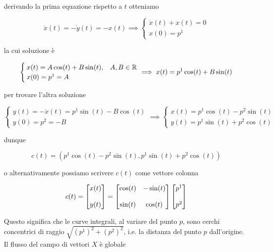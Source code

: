 derivando la prima equazione rispetto a $ t $ otteniamo

\begin{equation}
	\ddot{x}(t) = - \dot{y}(t) = - x(t) %
	\implies %
	\begin{cases}
		\ddot{x}(t) + x(t) = 0 \\
		x(0) = p^{1}
	\end{cases}
\end{equation}

la cui soluzione è

\begin{equation}
	\begin{cases}
		x(t) = A \cos(t) + B \sin(t), & A,B \in \R \\
		x(0) = p^{1} = A
	\end{cases} %
	\implies %
	x(t) = p^{1} \cos(t) + B \sin(t)
\end{equation}

per trovare l'altra soluzione

\begin{equation}
	\begin{cases}
		y(t) = - \dot{x}(t) = p^{1} \sin(t) - B \cos(t) \\
		y(0) = p^{2} = - B
	\end{cases} %
	\implies %
	\begin{cases}
		x(t) = p^{1} \cos(t) - p^{2} \sin(t) \\
		y(t) = p^{1} \sin(t) + p^{2} \cos(t)
	\end{cases}
\end{equation}

dunque

\begin{equation}
	c(t) = (p^{1} \cos(t) - p^{2} \sin(t), p^{1} \sin(t) + p^{2} \cos(t))
\end{equation}

o alternativamente possiamo scrivere $ c(t) $ come vettore colonna

\begin{equation}
	c(t) = \bmqty{ x(t) \\ \\ y(t) } %
	= \bmqty{
		\cos(t) & - \sin(t) \\ \\
		\sin(t) & \cos(t) %
		} %
		\bmqty{ p^{1} \\ \\ p^{2} }
\end{equation}

Questo significa che le curve integrali, al variare del punto $ p $, sono cerchi concentrici di raggio $ \sqrt{(p^{1})^{2} + (p^{2})^{2}} $, i.e. la distanza del punto $ p $ dall'origine. \\
Il flusso del campo di vettori $ X $ è globale

